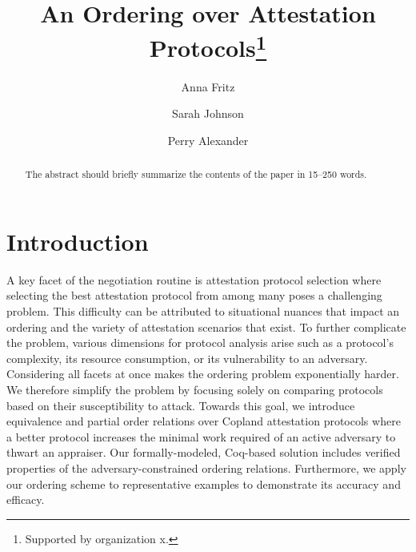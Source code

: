 \documentclass[runningheads]{llncs}
\theoremstyle{definition}
\begin{document}
%
\title{An Ordering over Attestation Protocols\thanks{Supported by organization x.}}
%
%
\author{Anna Fritz \and
Sarah Johnson \and
Perry Alexander}
%
%
%
\maketitle              %
%
\begin{abstract}
The abstract should briefly summarize the contents of the paper in
15--250 words.

\end{abstract}
%
%
%
\section{Introduction}

A key facet of the negotiation routine is attestation protocol selection where selecting the best attestation protocol from among many poses a challenging problem. This difficulty can be attributed to situational nuances that impact an ordering and the variety of attestation scenarios that exist. To further complicate the problem, various dimensions for protocol analysis arise such as a protocol's complexity, its resource consumption, or its vulnerability to an adversary. Considering all facets at once makes the ordering problem exponentially harder. We therefore simplify the problem by focusing solely on comparing protocols based on their susceptibility to attack. Towards this goal, we introduce equivalence and partial order relations over Copland attestation protocols where a better protocol increases the minimal work required of an active adversary to thwart an appraiser. Our formally-modeled, Coq-based solution includes verified properties of the adversary-constrained ordering relations. Furthermore, we apply our ordering scheme to representative examples to demonstrate its accuracy and efficacy.
\end{document}
